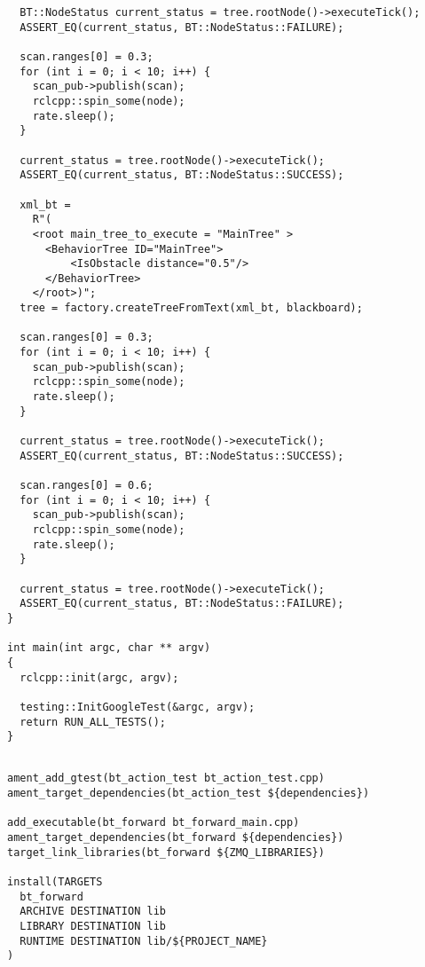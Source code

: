 \begin{tcolorbox}[sharp corners, colframe=gray!80, colback=LightGray, left=0pt, top=0pt, bottom=0pt, title=\texttt{br2\_bt\_bumpgo/tests/bt\_action\_test.cpp}]
\begin{verbatim}
  BT::NodeStatus current_status = tree.rootNode()->executeTick();
  ASSERT_EQ(current_status, BT::NodeStatus::FAILURE);

  scan.ranges[0] = 0.3;
  for (int i = 0; i < 10; i++) {
    scan_pub->publish(scan);
    rclcpp::spin_some(node);
    rate.sleep();
  }

  current_status = tree.rootNode()->executeTick();
  ASSERT_EQ(current_status, BT::NodeStatus::SUCCESS);

  xml_bt =
    R"(
    <root main_tree_to_execute = "MainTree" >
      <BehaviorTree ID="MainTree">
          <IsObstacle distance="0.5"/>
      </BehaviorTree>
    </root>)";
  tree = factory.createTreeFromText(xml_bt, blackboard);

  scan.ranges[0] = 0.3;
  for (int i = 0; i < 10; i++) {
    scan_pub->publish(scan);
    rclcpp::spin_some(node);
    rate.sleep();
  }

  current_status = tree.rootNode()->executeTick();
  ASSERT_EQ(current_status, BT::NodeStatus::SUCCESS);

  scan.ranges[0] = 0.6;
  for (int i = 0; i < 10; i++) {
    scan_pub->publish(scan);
    rclcpp::spin_some(node);
    rate.sleep();
  }

  current_status = tree.rootNode()->executeTick();
  ASSERT_EQ(current_status, BT::NodeStatus::FAILURE);
}

int main(int argc, char ** argv)
{
  rclcpp::init(argc, argv);

  testing::InitGoogleTest(&argc, argv);
  return RUN_ALL_TESTS();
}
    \end{verbatim}
    \end{tcolorbox}
  \normalsize

 \footnotesize
\begin{tcolorbox}[sharp corners, colframe=gray!80, colback=LightGray, left=0pt, top=0pt, bottom=0pt, title=\texttt{br2\_bt\_bumpgo/tests/CMakeLists.txt}]
  \begin{verbatim}

ament_add_gtest(bt_action_test bt_action_test.cpp)
ament_target_dependencies(bt_action_test ${dependencies})

add_executable(bt_forward bt_forward_main.cpp)
ament_target_dependencies(bt_forward ${dependencies})
target_link_libraries(bt_forward ${ZMQ_LIBRARIES})

install(TARGETS
  bt_forward
  ARCHIVE DESTINATION lib
  LIBRARY DESTINATION lib
  RUNTIME DESTINATION lib/${PROJECT_NAME}
)
    \end{verbatim}
    \end{tcolorbox}
  \normalsize


